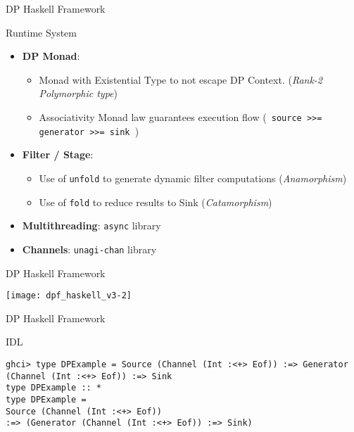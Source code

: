 \begin{frame}[fragile]{DP Haskell Framework}
\begin{block}{Runtime System}
  \begin{itemize}
    \item \textbf{DP Monad}:
    \begin{itemize} 
    \item Monad with Existential Type to not escape DP Context. (\textit{Rank-2 Polymorphic type})
    \item Associativity Monad law guarantees execution flow (\texttt{ source >>= generator >>= sink }) 
    \end{itemize}
  \item \textbf{Filter / Stage}: 
    \begin{itemize}
      \item Use of \texttt{unfold} to generate dynamic filter computations (\textit{Anamorphism})
      \item Use of \texttt{fold} to reduce results to Sink (\textit{Catamorphism})
    \end{itemize}
    \item \textbf{Multithreading}: \texttt{async} library
    \item \textbf{Channels}: \texttt{unagi-chan} library
  \end{itemize}
\end{block}
\end{frame}

\begin{frame}[fragile]{DP Haskell Framework}
  \begin{center}
    \texttt{[image: dpf\_haskell\_v3-2]}
  \end{center}
\end{frame}

\begin{frame}[fragile]{DP Haskell Framework}
  \begin{block}{IDL}
    \begin{verbatim}      
ghci> type DPExample = Source (Channel (Int :<+> Eof)) :=> Generator (Channel (Int :<+> Eof)) :=> Sink
type DPExample :: *
type DPExample =
Source (Channel (Int :<+> Eof))
:=> (Generator (Channel (Int :<+> Eof)) :=> Sink)
  \end{verbatim}
\end{block}
\end{frame}

